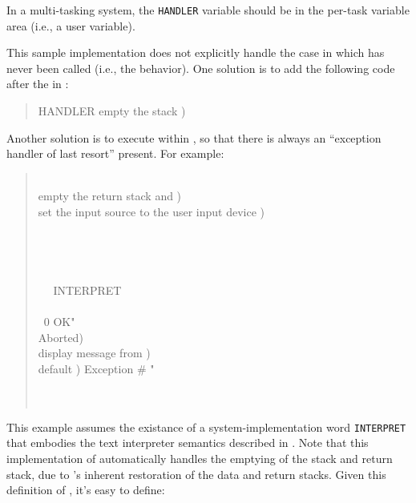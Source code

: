 \begin{intro}
In a multi-tasking system, the \texttt{HANDLER} variable should be in
the per-task variable area (i.e., a user variable).

This sample implementation does not explicitly handle the case in
which  has never been called (i.e., the
 behavior). One solution is to add the following
code after the  in :
\begin{quote}\ttfamily
	HANDLER   
		 empty the stack ) 
\end{quote}
Another solution is to execute  within
, so that there is always an ``exception handler of last
resort'' present. For example:
\begin{quote}\ttfamily
	\word{:}  \\
	\tab {} empty the return stack and ) \\
	\tab {} set the input source to the user input device )\\
	\tab {} \word{[} \\
	\tab {} \\
	\tab~~  \\
	\tab {} \\
	\tab~~ \word{[']} INTERPRET ~ \\
	\tab~~  \\
	\tab\tab ~0     
		 OK"   ~ \\
	\tab{}   Aborted)  \\
	\tab{}   display message from  )  \\
	\tab\tab {} default )   Exception \# " ~  \\
	\tab~~  \\
	\tab {}  \\
	\word{;}
\end{quote}

This example assumes the existance of a system-implementation word
\texttt{INTERPRET} that embodies the text interpreter semantics
described in .
Note that this implementation of  automatically handles
the emptying of the stack and return stack, due to
's inherent restoration of the data and return
stacks. Given this definition of , it's easy to define:


\end{intro}
